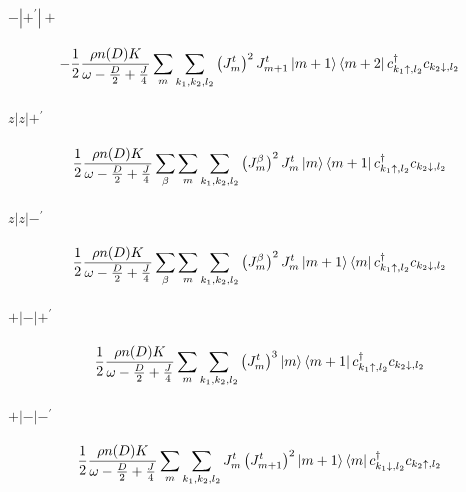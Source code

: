 \documentclass[12pt]{revtex4-2}
\begin{document}
\paragraph{\(-|+^\prime|+\)}
\begin{equation}\begin{aligned}
	-\frac{1}{2}\frac{\rho n(D) K}{\omega - \frac{D}{2} + \frac{J}{4}}\sum_{m}\sum_{k_1,k_2,l_2} \left( J^t_{m} \right)^2 J^t_{m+1}\ket{m+1}\bra{m+2}c^\dagger_{k_1 \uparrow, l_2}c_{k_2 \downarrow,l_2}
\end{aligned}\end{equation}

\paragraph{\(z|z|+^\prime\)}
\begin{equation}\begin{aligned}
	\frac{1}{2}\frac{\rho n(D) K}{\omega - \frac{D}{2} + \frac{J}{4}}\sum_\beta \sum_{m}\sum_{k_1,k_2,l_2}\left(J^\beta_m\right)^2 J^t_m \ket{m}\bra{m+1}c^\dagger_{k_1 \uparrow, l_2}c_{k_2 \downarrow,l_2}
\end{aligned}\end{equation}

\paragraph{\(z|z|-^\prime\)}
\begin{equation}\begin{aligned}
	\frac{1}{2}\frac{\rho n(D) K}{\omega - \frac{D}{2} + \frac{J}{4}}\sum_\beta \sum_{m}\sum_{k_1,k_2,l_2}\left(J^\beta_m\right)^2 J^t_m \ket{m+1}\bra{m} c^\dagger_{k_1 \uparrow, l_2}c_{k_2 \downarrow,l_2}
\end{aligned}\end{equation}

\paragraph{\(+|-|+^\prime\)}
\begin{equation}\begin{aligned}
	\frac{1}{2}\frac{\rho n(D) K}{\omega - \frac{D}{2} + \frac{J}{4}}\sum_{m}\sum_{k_1,k_2,l_2} \left( J^t_{m} \right)^3 \ket{m}\bra{m+1}c^\dagger_{k_1 \uparrow, l_2}c_{k_2 \downarrow,l_2}
\end{aligned}\end{equation}

\paragraph{\(+|-|-^\prime\)}
\begin{equation}\begin{aligned}
	\frac{1}{2}\frac{\rho n(D) K}{\omega - \frac{D}{2} + \frac{J}{4}}\sum_{m}\sum_{k_1,k_2,l_2} J^t_m \left( J^t_{m+1} \right)^2 \ket{m+1}\bra{m}c^\dagger_{k_1 \downarrow, l_2}c_{k_2 \uparrow,l_2}
\end{aligned}\end{equation}
\end{document}
